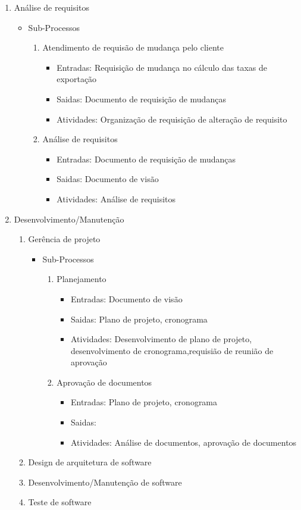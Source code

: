 \documentclass{article}
\begin{document}
	\begin{enumerate}
	\item Análise de requisitos
		\begin{itemize}
		\item Sub-Processos
			\begin{enumerate}
			\item Atendimento de requisão de mudança pelo cliente
				\begin{itemize}
				\item Entradas: Requisição de mudança no cálculo das taxas de exportação
				\item Saidas: Documento de requisição de mudanças
				\item Atividades: Organização de requisição de alteração de requisito
				\end{itemize}
			\item Análise de requisitos
				\begin{itemize}
				\item Entradas: Documento de requisição de mudanças
				\item Saidas: Documento de visão
				\item Atividades: Análise de requisitos
				\end{itemize}
			\end{enumerate}
		\end{itemize}
	\item Desenvolvimento/Manutenção
		\begin{enumerate}
		\item Gerência de projeto
			\begin{itemize}
			\item Sub-Processos
				\begin{enumerate}
				\item Planejamento
					\begin{itemize}
					\item Entradas: Documento de visão
					\item Saidas: Plano de projeto, cronograma
					\item Atividades: Desenvolvimento de plano de projeto, desenvolvimento de cronograma,requisião de reunião de aprovação		
					\end{itemize}
				\item Aprovação de documentos
					\begin{itemize}
					\item Entradas: Plano de projeto, cronograma
					\item Saidas: 
					\item Atividades: Análise de documentos, aprovação de documentos
					\end{itemize}
				\end{enumerate}
			\end{itemize}
		\item Design de arquitetura de software
		\item Desenvolvimento/Manutenção de software
		\item Teste de software
		\end{enumerate}
	\end{enumerate}
\end{document}
